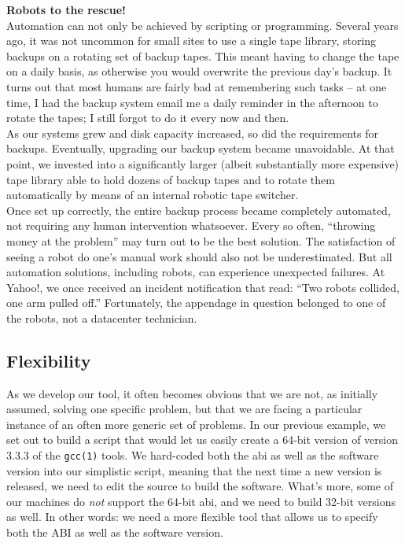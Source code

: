 \begin{experience}
{\bf Robots to the rescue!} \\

Automation can not only be achieved by scripting or
programming.  Several years ago, it was not uncommon
for small sites to use a single tape
library, storing backups on a
rotating set of backup tapes.  This meant having to
change the tape on a daily basis, as otherwise you
would overwrite the previous day's backup.  It turns
out that most humans are fairly bad at remembering
such tasks -- at one time, I had the backup system
email me a daily reminder in the afternoon to rotate
the tapes; I still forgot to do it every now and then.
\\ [10pt]

As our systems grew and disk capacity increased, so
did the requirements for backups.  Eventually,
upgrading our backup system became unavoidable.  At
that point, we invested into a significantly larger
(albeit substantially more expensive) tape library able
to hold dozens of backup tapes and to rotate them
automatically by means of an internal robotic tape
switcher.  \\ [10pt]

Once set up correctly, the entire backup process
became completely automated, not requiring any human
intervention whatsoever.  Every so often, ``throwing
money at the problem'' may turn out to be the best
solution.  The satisfaction of seeing a robot do one's
manual work should also not be underestimated.  But
all automation solutions, including robots, can
experience unexpected failures.  At Yahoo!, we once
received an incident notification that read: ``Two
robots collided, one arm pulled off.'' Fortunately,
the appendage in question belonged to one of the
robots, not a datacenter technician.  \end{experience}


\subsection{Flexibility}
\label{automation:benefits:flexibility}

As we develop our tool, it often becomes obvious that
we are not, as initially assumed, solving one specific
problem, but that we are facing a particular instance
of an often more generic set of problems.  In our
previous example, we set out to build a script that
would let us easily create a 64-bit version of version
3.3.3 of the \verb+gcc(1)+ tools.  We hard-coded both
the \gls{abi} as well as the software version into our
simplistic script, meaning that the next time a new
version is released, we need to edit the source to
build the software.  What's more, some of our machines
do {\em not} support the 64-bit \gls{abi}, and we need
to build 32-bit versions as well.  In other words: we
need a more flexible tool that allows us to specify
both the ABI as well as the software version.

